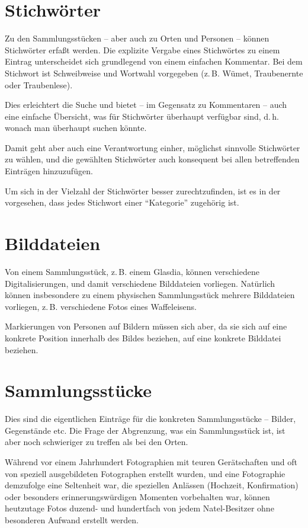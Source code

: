 \documentclass[12pt]{scrreprt}
\begin{document}
\section{Stichwörter} Zu den Sammlungsstücken -- aber auch zu Orten und Personen --
können Stichwörter erfaßt werden. Die explizite Vergabe eines
Stichwörtes zu einem Eintrag unterscheidet sich grundlegend von einem
einfachen Kommentar. Bei dem Stichwort ist Schweibweise und Wortwahl
vorgegeben (z.\,B. Wümet, Traubenernte oder Traubenlese).

Dies erleichtert die Suche und bietet -- im Gegensatz zu Kommentaren
-- auch eine einfache Übersicht, was für Stichwörter überhaupt
verfügbar sind, d.\,h.  wonach man überhaupt suchen könnte.

Damit geht aber auch eine Verantwortung einher, möglichst sinnvolle
Stichwörter zu wählen, und die gewählten Stichwörter auch konsequent
bei allen betreffenden Einträgen hinzuzufügen.

Um sich in der Vielzahl der Stichwörter besser zurechtzufinden, ist es
in der \DB{} vorgesehen, dass jedes Stichwort einer ``Kategorie''
zugehörig ist.


\section{Bilddateien} Von einem Sammlungsstück, z.\,B. einem Glasdia, können
verschiedene Digitalisierungen, und damit verschiedene Bilddateien
vorliegen. Natürlich können insbesondere zu einem physischen
Sammlungsstück mehrere Bilddateien vorliegen, z.\,B. verschiedene Fotos
eines Waffeleisens.

Markierungen von Personen auf Bildern müssen sich aber, da sie sich
auf eine konkrete Position innerhalb des Bildes beziehen, auf eine
konkrete Bilddatei beziehen.

\section{Sammlungsstücke} Dies sind die eigentlichen Einträge für die konkreten
Sammlungsstücke -- Bilder, Gegenstände etc. Die Frage der Abgrenzung, was
ein Sammlungsstück ist, ist aber noch schwieriger zu treffen als bei den Orten.

Während vor einem Jahrhundert Fotographien mit teuren Gerätschaften
und oft von speziell ausgebildeten Fotographen erstellt wurden, und
eine Fotographie demzufolge eine Seltenheit war, die speziellen
Anlässen (Hochzeit, Konfirmation) oder besonders erinnerungswürdigen
Momenten vorbehalten war, können heutzutage Fotos duzend- und
hundertfach von jedem Natel-Besitzer ohne besonderen Aufwand erstellt
werden.
\end{document}
